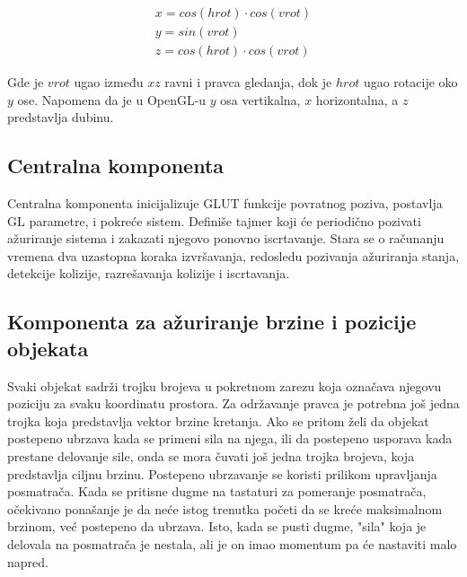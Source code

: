 \documentclass[12pt,oneside]{memoir}
\begin{document}
\begin{equation}
\label{eq:camera}
\begin{split}
x = cos(hrot) \cdot cos(vrot) \\
y = sin(vrot) \\
z = cos(hrot) \cdot  cos(vrot)	
\end{split}
\end{equation}


Gde je $vrot$ ugao između $xz$ ravni i pravca gledanja, dok je $hrot$ ugao rotacije oko $y$ ose.
Napomena da je u OpenGL-u $y$ osa vertikalna, $x$ horizontalna, a $z$ predstavlja dubinu.


\subsection{Centralna komponenta}

Centralna komponenta inicijalizuje GLUT funkcije povratnog poziva, postavlja GL parametre, i pokreće sistem.
Definiše tajmer koji će periodično pozivati ažuriranje sistema i zakazati njegovo ponovno iscrtavanje. 
Stara se o računanju vremena dva uzastopna koraka izvršavanja, redosledu pozivanja ažuriranja stanja,
detekcije kolizije, razrešavanja kolizije i iscrtavanja.

\subsection{Komponenta za ažuriranje brzine i pozicije objekata}

Svaki objekat sadrži trojku brojeva u pokretnom zarezu koja označava njegovu poziciju za svaku koordinatu prostora.
Za održavanje pravca je potrebna još jedna trojka koja predstavlja vektor brzine kretanja.
Ako se pritom želi da objekat postepeno ubrzava kada se primeni sila na njega, ili da postepeno usporava 
kada prestane delovanje sile, onda se mora čuvati još jedna trojka brojeva, koja predstavlja ciljnu brzinu.
Postepeno ubrzavanje se koristi prilikom upravljanja posmatrača. 
Kada se pritisne dugme na tastaturi za pomeranje posmatrača, očekivano ponašanje je da neće istog trenutka 
početi da se kreće maksimalnom brzinom, već postepeno da ubrzava.
Isto, kada se pusti dugme, "sila" koja je delovala na posmatrača je nestala, ali je on imao momentum pa će
nastaviti malo napred.
\end{document}
